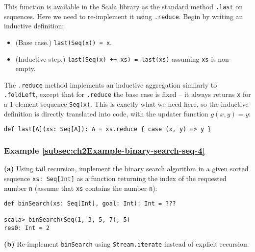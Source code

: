 This function is available in the Scala library as the standard method
\lstinline!.last! on sequences.
Here we need to re-implement it using \lstinline!.reduce!.
Begin by writing an inductive definition:
\begin{itemize}
\item (Base case.) \lstinline!last(Seq(x)) = x!.
\item (Inductive step.) \lstinline!last(Seq(x) ++ xs) = last(xs)!
assuming \lstinline!xs!
is non-empty.
\end{itemize}
The \lstinline!.reduce!
method implements an inductive aggregation similarly to \lstinline!.foldLeft!,
except that for \lstinline!.reduce!
the base case is fixed – it always returns \lstinline!x!
for a 1-element sequence \lstinline!Seq(x)!.
This is exactly what we need here, so the inductive definition is
directly translated into code, with the updater function $g(x,y)=y$:
\begin{lstlisting}
def last[A](xs: Seq[A]): A = xs.reduce { case (x, y) => y }
\end{lstlisting}

\subsubsection{Example \label{subsec:ch2Example-binary-search-seq-4}\ref{subsec:ch2Example-binary-search-seq-4}}

\textbf{(a)} Using tail recursion, implement the binary search algorithm
in a given sorted sequence \lstinline!xs: Seq[Int]!
as a function returning the index of the requested number \lstinline!n!
(assume that \lstinline!xs!
contains the number \lstinline!n!):
\begin{lstlisting}
def binSearch(xs: Seq[Int], goal: Int): Int = ???

scala> binSearch(Seq(1, 3, 5, 7), 5)
res0: Int = 2
\end{lstlisting}
\textbf{(b)} Re-implement \lstinline!binSearch!
using \lstinline!Stream.iterate!
instead of explicit recursion.

